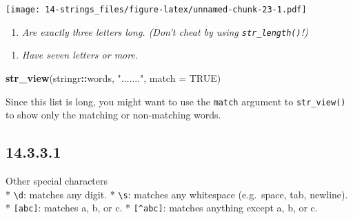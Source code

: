 \documentclass[]{book}
\newenvironment{Shaded}{\begin{snugshade}}{\end{snugshade}}
\newcommand{\DataTypeTok}[1]{\textcolor[rgb]{0.13,0.29,0.53}{#1}}
\newcommand{\KeywordTok}[1]{\textcolor[rgb]{0.13,0.29,0.53}{\textbf{#1}}}
\newcommand{\NormalTok}[1]{#1}
\newcommand{\OperatorTok}[1]{\textcolor[rgb]{0.81,0.36,0.00}{\textbf{#1}}}
\newcommand{\OtherTok}[1]{\textcolor[rgb]{0.56,0.35,0.01}{#1}}
\newcommand{\StringTok}[1]{\textcolor[rgb]{0.31,0.60,0.02}{#1}}
\providecommand{\tightlist}{%
  \setlength{\itemsep}{0pt}\setlength{\parskip}{0pt}}
\theoremstyle{definition}
\theoremstyle{definition}
\theoremstyle{definition}
\theoremstyle{remark}
\begin{document}
\begin{enumerate}
  \texttt{[image: 14-strings\_files/figure-latex/unnamed-chunk-23-1.pdf]}

  \begin{enumerate}
  \def\labelenumii{\arabic{enumii}.}
  \setcounter{enumii}{2}
  \tightlist
  \item
    \emph{Are exactly three letters long. (Don't cheat by using
    \texttt{str\_length()}!)}
  \end{enumerate}

\begin{Shaded}
\end{Shaded}

  \begin{enumerate}
  \def\labelenumii{\arabic{enumii}.}
  \setcounter{enumii}{3}
  \tightlist
  \item
    \emph{Have seven letters or more.}
  \end{enumerate}

\begin{Shaded}
\begin{Highlighting}[]
\KeywordTok{str_view}\NormalTok{(stringr}\OperatorTok{::}\NormalTok{words, }\StringTok{"......."}\NormalTok{, }\DataTypeTok{match =} \OtherTok{TRUE}\NormalTok{)}
\end{Highlighting}
\end{Shaded}

  Since this list is long, you might want to use the \texttt{match}
  argument to \texttt{str\_view()} to show only the matching or
  non-matching words.
\end{enumerate}

\hypertarget{section-43}{%
\subsection{14.3.3.1}\label{section-43}}

Other special characters\\
* \texttt{\textbackslash{}d}: matches any digit. *
\texttt{\textbackslash{}s}: matches any whitespace (e.g.~space, tab,
newline). * \texttt{{[}abc{]}}: matches a, b, or c. *
\texttt{{[}\^{}abc{]}}: matches anything except a, b, or c.
\end{document}
